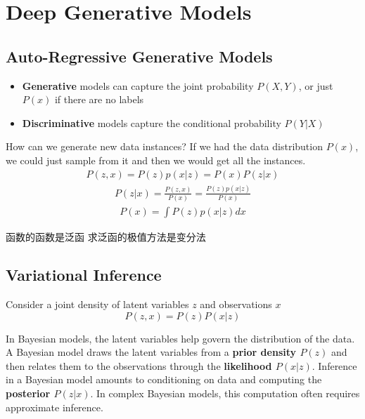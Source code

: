 \chapter{Deep Generative Models}

\section{Auto-Regressive Generative Models}

\begin{itemize}
    \item \textbf{Generative} models can capture the joint probability $P(X, Y)$, or just $P(x)$ if there are no labels
    \item \textbf{Discriminative} models capture the conditional probability $P(Y|X)$
\end{itemize}

How can we generate new data instances? If we had the data distribution $P(x)$, we could just sample
from it and then we would get all the instances.
\begin{equation}
    \begin{split}
        P(z, x) = P(z)p(x|z) = P(x)P(z|x)
    \end{split}
\end{equation}
\begin{equation}
    \begin{split}
        P(z|x) = \frac{P(z, x)}{P(x)}
        = \frac{P(z)p(x|z)}{P(x)}
    \end{split}
\end{equation}
\begin{equation}
    \begin{split}
        P(x) = \int P(z)p(x|z)dx
    \end{split}
\end{equation}

函数的函数是泛函
求泛函的极值方法是变分法

\section{Variational Inference}

Consider a joint density of latent variables $z$ and observations $x$
\begin{equation}
    P(z, x) = P(z)P(x|z)
\end{equation}

In Bayesian models, the latent variables help govern the distribution of the data. A Bayesian
model draws the latent variables from a \textbf{prior density $P(z)$} and then relates them to the
observations through the \textbf{likelihood $P(x|z)$}. Inference in a Bayesian model amounts to
conditioning on data and computing the \textbf{posterior $P(z|x)$}. In complex Bayesian models,
this computation often requires approximate inference.

